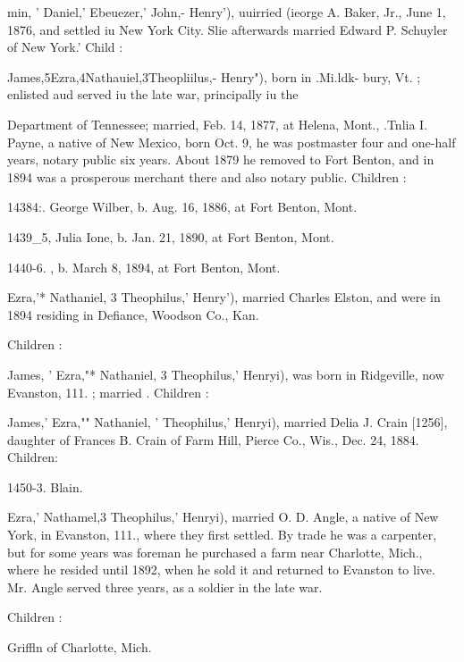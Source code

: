 \documentclass{book}
\begin{document}
min, ' Daniel,' Ebeuezer,' John,- Henry'), uuirried (ieorge A. 
Baker, Jr., June 1, 1876, and settled iu New York City. Slie 
afterwards married Edward P. Schuyler of New York.' Child : 


James,5Ezra,4Nathauiel,3Theopliilus,- Henry"), born in .Mi.ldk- 
bury, Vt. ; enlisted aud served iu the late war, principally iu the 




Department of Tennessee; married, Feb. 14, 1877, at Helena, 
Mont., .Tnlia I. Payne, a native of New Mexico, born Oct. 9, 
he was postmaster four and one-half years, notary public six 
years. About 1879 he removed to Fort Benton, and in 1894 was 
a prosperous merchant there and also notary public. Children : 




14384:. George Wilber, b. Aug. 16, 1886, at Fort Benton, Mont. 

1439\_5, Julia Ione, b. Jan. 21, 1890, at Fort Benton, Mont. 

1440-6. , b. March 8, 1894, at Fort Benton, Mont. 

Ezra,'* Nathaniel, 3 Theophilus,' Henry'), married Charles Elston, 
and were in 1894 residing in Defiance, Woodson Co., Kan. 

Children : 






James, ' Ezra,"* Nathaniel, 3 Theophilus,' Henryi), was born in 
Ridgeville, now Evanston, 111. ; married . Children : 





James,' Ezra,"" Nathaniel, ' Theophilus,' Henryi), married Delia 
J. Crain [1256], daughter of Frances B. Crain of Farm Hill, 
Pierce Co., Wis., Dec. 24, 1884. Children: 

1450-3. Blain. 

Ezra,' Nathamel,3 Theophilus,' Henryi), married O. D. Angle, 
a native of New York, in Evanston, 111., where they first settled. 
By trade he was a carpenter, but for some years was foreman 
he purchased a farm near Charlotte, Mich., where he resided 
until 1892, when he sold it and returned to Evanston to live. 
Mr. Angle served three years, as a soldier in the late war. 

Children : 



Griffln of Charlotte, Mich. 
\end{document}
